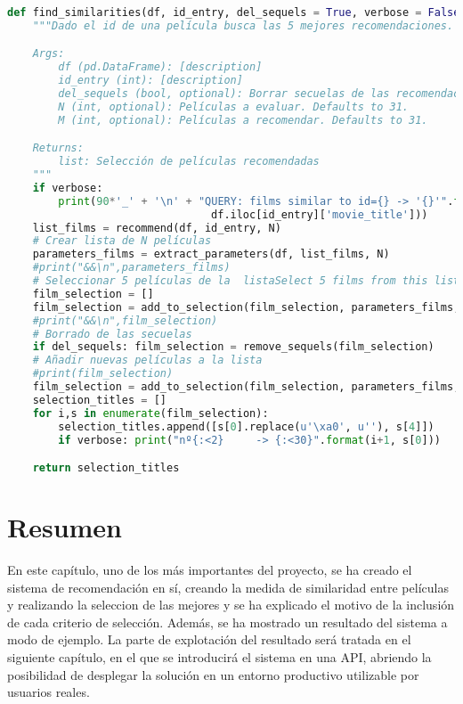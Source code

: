 \begin{lstlisting}[language=Python, caption=Wrapper del pipeline de búsqueda de recomendaciones.]
def find_similarities(df, id_entry, del_sequels = True, verbose = False, N = 31):
    """Dado el id de una película busca las 5 mejores recomendaciones.

    Args:
        df (pd.DataFrame): [description]
        id_entry (int): [description]
        del_sequels (bool, optional): Borrar secuelas de las recomendaciones. Defaults to True.
        N (int, optional): Películas a evaluar. Defaults to 31.
        M (int, optional): Películas a recomendar. Defaults to 31.

    Returns:
        list: Selección de películas recomendadas
    """
    if verbose: 
        print(90*'_' + '\n' + "QUERY: films similar to id={} -> '{}'".format(id_entry,
                                df.iloc[id_entry]['movie_title']))
    list_films = recommend(df, id_entry, N)
    # Crear lista de N películas
    parameters_films = extract_parameters(df, list_films, N)
    #print("&&\n",parameters_films)
    # Seleccionar 5 películas de la  listaSelect 5 films from this list
    film_selection = []
    film_selection = add_to_selection(film_selection, parameters_films, N)
    #print("&&\n",film_selection)
    # Borrado de las secuelas
    if del_sequels: film_selection = remove_sequels(film_selection)
    # Añadir nuevas películas a la lista
    #print(film_selection)
    film_selection = add_to_selection(film_selection, parameters_films, N)
    selection_titles = []
    for i,s in enumerate(film_selection):
        selection_titles.append([s[0].replace(u'\xa0', u''), s[4]])
        if verbose: print("nº{:<2}     -> {:<30}".format(i+1, s[0]))

    return selection_titles
\end{lstlisting}

\section{Resumen}

En este capítulo, uno de los más importantes del proyecto, se ha creado el sistema de recomendación en sí, creando la medida de similaridad entre películas y realizando la seleccion de las mejores y se ha explicado el motivo de la inclusión de cada criterio de selección. Además, se ha mostrado un resultado del sistema a modo de ejemplo. La parte de explotación del resultado será tratada en el siguiente capítulo, en el que se introducirá el sistema en una API, abriendo la posibilidad de desplegar la solución en un entorno productivo utilizable por usuarios reales.